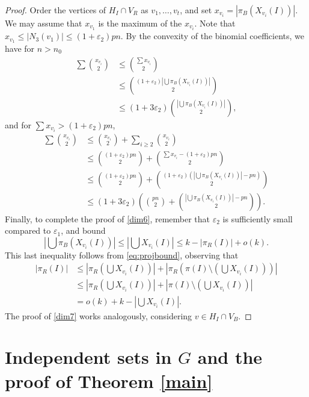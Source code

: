 \documentclass{article}
\begin{document}
\begin{proof}
    Order the vertices of $H_I \cap V_R$ as $v_1, \dots, v_t$, and set $x_{v_i} = |\pi_B(X_{v_i}(I))|$. We may assume that $x_{v_1}$ is the maximum of the $x_{v_i}$. Note that $x_{v_1} \leq |N_3(v_1)| \leq (1+\varepsilon_2)pn$.  
    By the convexity of the binomial coefficients, we have for 
    $n>n_0$
    \begin{align*}
        \sum \binom{x_{v_i}}{2}&\le {\sum x_{v_i}\choose 2}\\
        &\le {(1+\varepsilon_2)\left| \bigcup \pi_B(X_{v_i}(I))\right|\choose 2}\\
        &\le (1+3\varepsilon_2){\left| \bigcup \pi_B(X_{v_i}(I))\right|\choose 2},
    \end{align*}
    and for $\sum x_{v_i}>(1+\varepsilon_2)pn$,
\begin{align*}
        \sum \binom{x_{v_i}}{2}&\le  {x_{v_1}\choose 2}+\sum_{i\ge 2} \binom{x_{v_i}}{2}\\
        &\le {(1+\varepsilon_2)pn\choose 2}+{\sum x_{v_i}-(1+\varepsilon_2)pn\choose 2}\\
        &\le {(1+\varepsilon_2)pn\choose 2}+{(1+\varepsilon_2)\left(\left| \bigcup \pi_B(X_{v_i}(I))\right|-pn\right)\choose 2}\\
        &\le (1+3\varepsilon_2)\left( {pn\choose 2}+{\left| \bigcup \pi_B(X_{v_i}(I))\right|-pn\choose 2}\right).
    \end{align*}
    \noindent    Finally, to complete the proof of \eqref{dim6}, remember that $\varepsilon_2$ is sufficiently small compared to $\varepsilon_1$, and  bound 
    \[
    \left|\bigcup \pi_{B}(X_{v_i}(I))\right| \leq \left|\bigcup X_{v_i}(I) \right| \leq k - |\pi_R(I)| + o(k).  \]
This last inequality follows from \eqref{eq:projbound}, 
    observing that
    \begin{align*}
    |\pi_R(I)| &\leq \left|\pi_R\left( \bigcup X_{v_i}(I) \right) \right|+\left|\pi_R\left(\pi(I) \setminus \left(\bigcup X_{v_i}(I)\right) \right) \right| \\ 
    &\leq \left|\pi_R\left( \bigcup X_{v_i}(I) \right) \right|+\left|\pi(I) \setminus \left(\bigcup X_{v_i}(I)\right)  \right| \\ 
    &= o(k) +k-\left|\bigcup X_{v_i}(I)\right|.
    \end{align*}
The proof of \eqref{dim7} works analogously, considering $v \in H_I \cap V_B$.  
\end{proof}

\section{Independent sets in $G$ and the proof of Theorem \ref{main}}\label{sec:independence}
\end{document}

